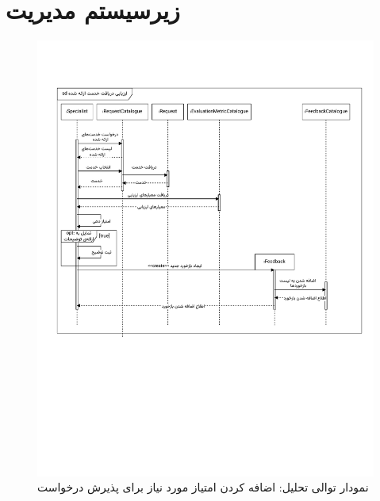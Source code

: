 \section{زیرسیستم مدیریت}
\FloatBarrier
\begin{figure}[ht!]
	\centering
	\includegraphics[scale=0.8, page=9]{figs/OOD-Sequence-3.pdf}
	\caption{نمودار توالی تحلیل: اضافه کردن امتیاز مورد نیاز برای پذیرش درخواست}
\end{figure}
\FloatBarrier
\newpage


